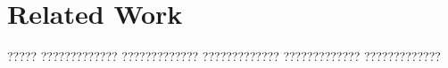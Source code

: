 \chapter{Related Work}

????? ????????????? ????????????? ????????????? ????????????? ????????????? 